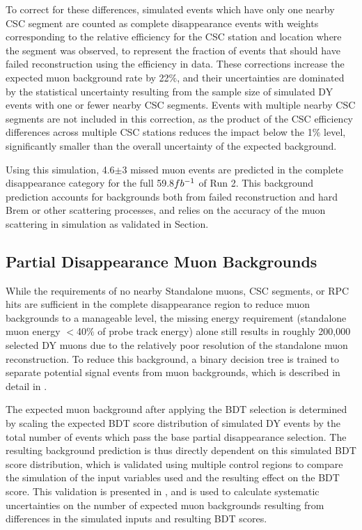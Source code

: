 To correct for these differences, simulated events which have only one nearby CSC segment are counted as complete disappearance events with weights corresponding to the relative efficiency for the CSC station and location where the segment was observed, to represent the fraction of events that should have failed reconstruction using the efficiency in data.
These corrections increase the expected muon background rate by 22$\%$, and their uncertainties are dominated by the statistical uncertainty resulting from the sample size of simulated DY events with one or fewer nearby CSC segments.
Events with multiple nearby CSC segments are not included in this correction, as the product of the CSC efficiency differences across multiple CSC stations reduces the impact below the 1$\%$ level, significantly smaller than the overall uncertainty of the expected background.

Using this simulation, 4.6$\pm$3 missed muon events are predicted in the complete disappearance category for the full 59.8$fb^{-1}$ of Run 2. 
This background prediction accounts for backgrounds both from failed reconstruction and hard Brem or other scattering processes, and relies on the accuracy of the muon scattering in simulation as validated in Section.

\subsection{Partial Disappearance Muon Backgrounds}
While the requirements of no nearby Standalone muons, CSC segments, or RPC hits are sufficient in the complete disappearance region to reduce muon backgrounds to a manageable level, the missing energy requirement (standalone muon energy $<$40$\%$ of probe track energy) alone still results in roughly 200,000 selected DY muons due to the relatively poor resolution of the standalone muon reconstruction.
To reduce this background, a binary decision tree is trained to separate potential signal events from muon backgrounds, which is described in detail in .

The expected muon background after applying the BDT selection is determined by scaling the expected BDT score distribution of simulated DY events by the total number of events which pass the base partial disappearance selection.
The resulting background prediction is thus directly dependent on this simulated BDT score distribution, which is validated using multiple control regions to compare the simulation of the input variables used and the resulting effect on the BDT score.
This validation is presented in , and is used to calculate systematic uncertainties on the number of expected muon backgrounds resulting from differences in the simulated inputs and resulting BDT scores.

